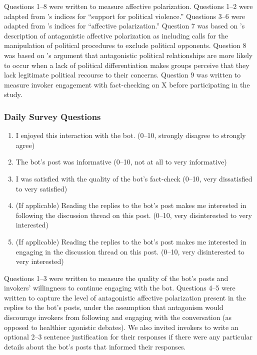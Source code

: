 Questions 1--8 were written to measure affective polarization. Questions 1--2 were adapted from \citet{Strayetal2026ProsocialRrankingChallenge}'s indices for ``support for political violence.'' Questions 3--6 were adapted from \citet{Strayetal2026ProsocialRrankingChallenge}'s indices for ``affective polarization.'' Question 7 was  based on \citet{Westphal2024AffectivePolarization}'s description of antagonistic affective polarization as including calls for the manipulation of political procedures to exclude political opponents. Question 8 was based on \citet{Mouffe2000DemocraticParadox}'s argument that antagonistic political relationships are more likely to occur when a lack of political differentiation makes groups perceive that they lack legitimate political recourse to their concerns. Question 9 was written to measure invoker engagement with fact-checking on X before participating in the study.

\subsubsection{Daily Survey Questions}
\begin{enumerate}
    \item I enjoyed this interaction with the bot. (0--10, strongly disagree to strongly agree)
    \item The bot's post was informative (0--10, not at all to very informative)
    \item I was satisfied with the quality of the bot's fact-check (0--10, very dissatisfied to very satisfied)
    \item (If applicable) Reading the replies to the bot's post makes me interested in following the discussion thread on this post. (0--10, very disinterested to very interested)
    \item (If applicable) Reading the replies to the bot's post makes me interested in engaging in the discussion thread on this post. (0--10, very disinterested to very interested)
\end{enumerate}
Questions 1--3 were written to measure the quality of the bot's posts and invokers' willingness to continue engaging with the bot. Questions 4--5 were written to capture the level of antagonistic affective polarization present in the replies to the bot's posts, under the assumption that antagonism would discourage invokers from following and engaging with the conversation (as opposed to healthier agonistic debates). We also invited invokers to write an optional 2--3 sentence justification for their responses if there were any particular details about the bot's posts that informed their responses. 

